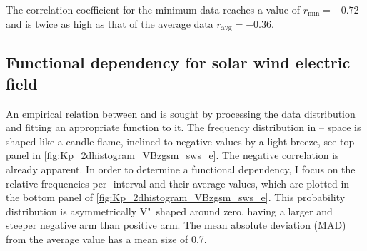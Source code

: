 The correlation coefficient for the minimum data reaches a value of $r_\text{min} = -0.72$ and is twice as high as that of the average data $r_\text{avg} = -0.36$.


\subsection{Functional dependency for solar wind electric field}
An empirical relation between \vBz{} and \Kp{} is sought by processing the data distribution and fitting an appropriate function to it.
The frequency distribution in \Kp--\vBz{} space is shaped like a candle flame, inclined to negative values by a light breeze, see top panel in \autoref{fig:Kp_2dhistogram_VBzgsm_sws_e}. The negative correlation is already apparent.
In order to determine a functional dependency, I focus on the relative frequencies per \vBz-interval and their average \Kp{} values, which are plotted in the bottom panel of \autoref{fig:Kp_2dhistogram_VBzgsm_sws_e}. This probability distribution is asymmetrically V"~shaped around zero, having a larger and steeper negative arm than positive arm. The mean absolute deviation (MAD) from the average \Kp{} value has a mean size of \num{0.7}.
\begin{figure}[htb]
\end{figure}

